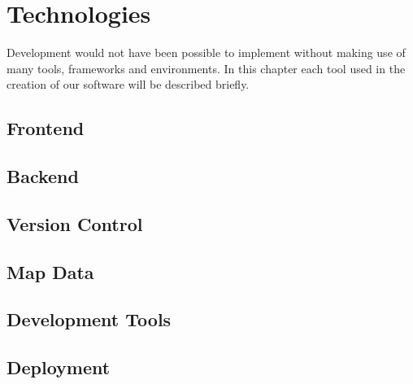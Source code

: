 \section{Technologies}

Development would not have been possible to implement without making use of many tools, frameworks and environments. In this chapter each tool used in the creation of our software will be described briefly.

%

%

\subsection{Frontend}


\subsection{Backend}


\subsection{Version Control}


\subsection{Map Data}


\subsection{Development Tools}


\subsection{Deployment}
